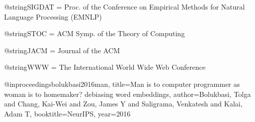 @string{SIGDAT = {Proc. of the Conference on Empirical Methods for Natural Language Processing (EMNLP)}}


@string{STOC = {ACM Symp. of the Theory of Computing}}

@string{JACM = {Journal of the ACM}}

@string{WWW = {The International World Wide Web Conference}}





@inproceedings{bolukbasi2016man,
  title={Man is to computer programmer as woman is to homemaker? debiasing word embeddings},
  author={Bolukbasi, Tolga and Chang, Kai-Wei and Zou, James Y and Saligrama, Venkatesh and Kalai, Adam T},
  booktitle=NeurIPS,
  year={2016}
}
